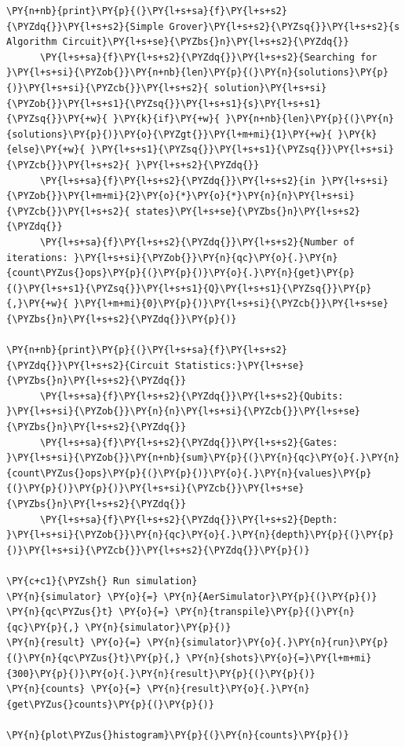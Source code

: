     \begin{tcolorbox}[breakable, size=fbox, boxrule=1pt, pad at break*=1mm,colback=cellbackground, colframe=cellborder]
\begin{Verbatim}[commandchars=\\\{\}]
\PY{n+nb}{print}\PY{p}{(}\PY{l+s+sa}{f}\PY{l+s+s2}{\PYZdq{}}\PY{l+s+s2}{Simple Grover}\PY{l+s+s2}{\PYZsq{}}\PY{l+s+s2}{s Algorithm Circuit}\PY{l+s+se}{\PYZbs{}n}\PY{l+s+s2}{\PYZdq{}}
      \PY{l+s+sa}{f}\PY{l+s+s2}{\PYZdq{}}\PY{l+s+s2}{Searching for }\PY{l+s+si}{\PYZob{}}\PY{n+nb}{len}\PY{p}{(}\PY{n}{solutions}\PY{p}{)}\PY{l+s+si}{\PYZcb{}}\PY{l+s+s2}{ solution}\PY{l+s+si}{\PYZob{}}\PY{l+s+s1}{\PYZsq{}}\PY{l+s+s1}{s}\PY{l+s+s1}{\PYZsq{}}\PY{+w}{ }\PY{k}{if}\PY{+w}{ }\PY{n+nb}{len}\PY{p}{(}\PY{n}{solutions}\PY{p}{)}\PY{o}{\PYZgt{}}\PY{l+m+mi}{1}\PY{+w}{ }\PY{k}{else}\PY{+w}{ }\PY{l+s+s1}{\PYZsq{}}\PY{l+s+s1}{\PYZsq{}}\PY{l+s+si}{\PYZcb{}}\PY{l+s+s2}{ }\PY{l+s+s2}{\PYZdq{}}
      \PY{l+s+sa}{f}\PY{l+s+s2}{\PYZdq{}}\PY{l+s+s2}{in }\PY{l+s+si}{\PYZob{}}\PY{l+m+mi}{2}\PY{o}{*}\PY{o}{*}\PY{n}{n}\PY{l+s+si}{\PYZcb{}}\PY{l+s+s2}{ states}\PY{l+s+se}{\PYZbs{}n}\PY{l+s+s2}{\PYZdq{}}
      \PY{l+s+sa}{f}\PY{l+s+s2}{\PYZdq{}}\PY{l+s+s2}{Number of iterations: }\PY{l+s+si}{\PYZob{}}\PY{n}{qc}\PY{o}{.}\PY{n}{count\PYZus{}ops}\PY{p}{(}\PY{p}{)}\PY{o}{.}\PY{n}{get}\PY{p}{(}\PY{l+s+s1}{\PYZsq{}}\PY{l+s+s1}{Q}\PY{l+s+s1}{\PYZsq{}}\PY{p}{,}\PY{+w}{ }\PY{l+m+mi}{0}\PY{p}{)}\PY{l+s+si}{\PYZcb{}}\PY{l+s+se}{\PYZbs{}n}\PY{l+s+s2}{\PYZdq{}}\PY{p}{)}

\PY{n+nb}{print}\PY{p}{(}\PY{l+s+sa}{f}\PY{l+s+s2}{\PYZdq{}}\PY{l+s+s2}{Circuit Statistics:}\PY{l+s+se}{\PYZbs{}n}\PY{l+s+s2}{\PYZdq{}}
      \PY{l+s+sa}{f}\PY{l+s+s2}{\PYZdq{}}\PY{l+s+s2}{Qubits: }\PY{l+s+si}{\PYZob{}}\PY{n}{n}\PY{l+s+si}{\PYZcb{}}\PY{l+s+se}{\PYZbs{}n}\PY{l+s+s2}{\PYZdq{}}
      \PY{l+s+sa}{f}\PY{l+s+s2}{\PYZdq{}}\PY{l+s+s2}{Gates: }\PY{l+s+si}{\PYZob{}}\PY{n+nb}{sum}\PY{p}{(}\PY{n}{qc}\PY{o}{.}\PY{n}{count\PYZus{}ops}\PY{p}{(}\PY{p}{)}\PY{o}{.}\PY{n}{values}\PY{p}{(}\PY{p}{)}\PY{p}{)}\PY{l+s+si}{\PYZcb{}}\PY{l+s+se}{\PYZbs{}n}\PY{l+s+s2}{\PYZdq{}}
      \PY{l+s+sa}{f}\PY{l+s+s2}{\PYZdq{}}\PY{l+s+s2}{Depth: }\PY{l+s+si}{\PYZob{}}\PY{n}{qc}\PY{o}{.}\PY{n}{depth}\PY{p}{(}\PY{p}{)}\PY{l+s+si}{\PYZcb{}}\PY{l+s+s2}{\PYZdq{}}\PY{p}{)}

\PY{c+c1}{\PYZsh{} Run simulation}
\PY{n}{simulator} \PY{o}{=} \PY{n}{AerSimulator}\PY{p}{(}\PY{p}{)}
\PY{n}{qc\PYZus{}t} \PY{o}{=} \PY{n}{transpile}\PY{p}{(}\PY{n}{qc}\PY{p}{,} \PY{n}{simulator}\PY{p}{)}
\PY{n}{result} \PY{o}{=} \PY{n}{simulator}\PY{o}{.}\PY{n}{run}\PY{p}{(}\PY{n}{qc\PYZus{}t}\PY{p}{,} \PY{n}{shots}\PY{o}{=}\PY{l+m+mi}{300}\PY{p}{)}\PY{o}{.}\PY{n}{result}\PY{p}{(}\PY{p}{)}
\PY{n}{counts} \PY{o}{=} \PY{n}{result}\PY{o}{.}\PY{n}{get\PYZus{}counts}\PY{p}{(}\PY{p}{)}

\PY{n}{plot\PYZus{}histogram}\PY{p}{(}\PY{n}{counts}\PY{p}{)}
\end{Verbatim}
\end{tcolorbox}

